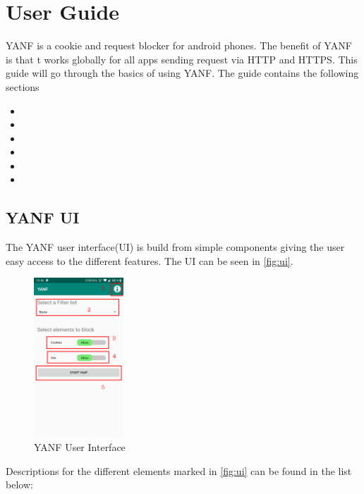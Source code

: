 \documentclass[main.tex]{subfiles}
\begin{document}
\section{User Guide}
\label{sec:userguide}
YANF is a cookie and request blocker for android phones. The benefit of YANF is that t works globally for all apps sending request via HTTP and HTTPS. This guide will go through the basics of using YANF. The guide contains the following sections

\begin{itemize}
    \item {}
    \item {}
    \item {}
    \item {}
    \item {}
    \item {}
\end{itemize}

\subsection{YANF UI}
\label{UG-YANF-UI}
The YANF user interface(UI) is build from simple components giving the user easy access to the different features. The UI can be seen in \autoref{fig:ui}.

\begin{figure}[H]
    \centering
    \includegraphics[width=0.3\textwidth]{1_Appendix/UI/yanf_numbered.png}
    \caption{YANF User Interface}
    \label{fig:ui}
\end{figure}

Descriptions for the different elements marked in \autoref{fig:ui} can be found in the list below:
\end{document}
